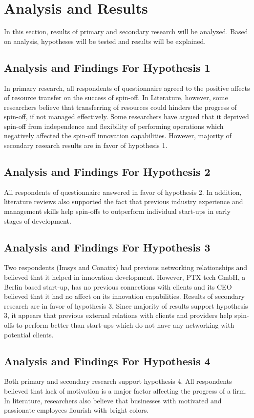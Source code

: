 \chapter{Analysis and Results\label{cha:chapter5}}
In this section, results of primary and secondary research will be analyzed. Based on analysis,
hypotheses will be tested and results will be explained.

\section{Analysis and Findings For Hypothesis 1}
In primary research, all respondents of questionnaire agreed to the positive affects of resource
transfer on the success of spin-off. In Literature, however, some researchers believe that transferring of
resources could hinders the progress of spin-off, if not managed effectively. Some researchers have
argued that it deprived spin-off from independence and flexibility of performing operations which
negatively affected the spin-off innovation capabilities. However, majority of secondary research results are in
favor of hypothesis 1.

\section{Analysis and Findings For Hypothesis 2}
All respondents of questionnaire answered in favor of hypothesis 2. In addition, literature reviews
also supported the fact that previous industry experience and management skills help spin-offs to
outperform individual start-ups in early stages of development.

\section{Analysis and Findings For Hypothesis 3}
Two respondents (Imsys and Conatix) had previous networking relationships and believed that it
helped in innovation development. However, PTX tech GmbH, a Berlin based start-up, has no
previous connections with clients and its CEO believed that it had no affect on its innovation
capabilities. Results of secondary research are in favor of hypothesis 3. Since majority of results
support hypothesis 3, it appears that previous external relations with clients and providers help spin-offs to perform better than start-ups which do not have any networking with potential clients.


\section{Analysis and Findings For Hypothesis 4}

Both primary and secondary research support hypothesis 4. All respondents believed that lack of
motivation is a major factor affecting the progress of a firm. In literature, researchers also believe
that businesses with motivated and passionate employees flourish with bright colors.